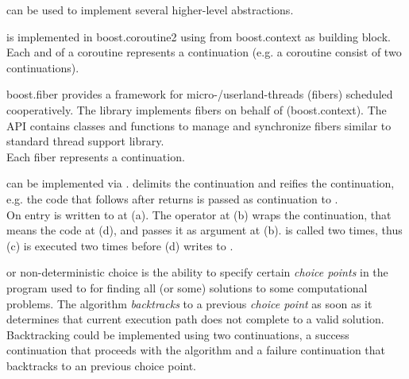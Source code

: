 
\cc can be used to implement several higher-level abstractions.



is implemented in boost.coroutine2\cite{bcoroutine2} using \cc from
boost.context\cite{bcontext} as building block. Each  and
 of a coroutine represents a continuation (e.g. a coroutine
consist of two continuations).



boost.fiber\cite{bfiber} provides a framework for micro-/userland-threads
(fibers) scheduled cooperatively. The library implements fibers on behalf of \cc
(boost.context\cite{bcontext}). The API contains classes and functions to manage
and synchronize fibers similar to standard thread support library.\\
Each fiber represents a continuation.



can be implemented via \cc.  delimits the continuation and
 reifies the continuation, e.g. the code that follows after
 returns is passed as continuation to .\\

On entry  is written to  at (a). The  operator
at (b) wraps the continuation, that means the code at (d), and passes it as
argument  at (b).  is called two times, thus (c) is
executed two times before (d) writes  to .



or non-deterministic choice is the ability to specify certain
\emph{choice points} in the program used to for finding all (or some) solutions
to some computational problems. The algorithm \emph{backtracks} to a previous
\emph{choice point} as soon as it determines that current execution path does
not complete to a valid solution.\\
Backtracking could be implemented using two continuations, a success
continuation that proceeds with the algorithm and a failure continuation that
backtracks to an previous choice point.
